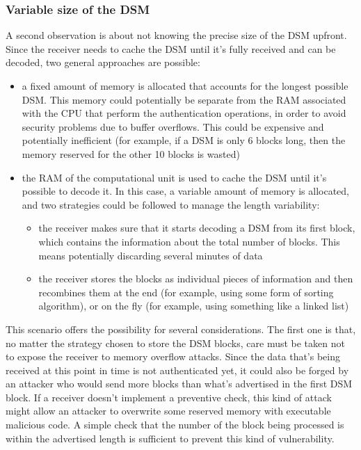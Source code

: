 \subsubsection{Variable size of the DSM}
A second observation is about not knowing the precise size of the DSM upfront.
Since the receiver needs to cache the DSM until it's fully received and can be
decoded, two general approaches are possible:
\begin{itemize}
  \item a fixed amount of memory is allocated that accounts for the longest
    possible DSM. This memory could potentially be separate from the RAM
    associated with the CPU that perform the authentication operations, in order
    to avoid security problems due to buffer overflows. This could be expensive
    and potentially inefficient (for example, if a DSM is only 6 blocks long,
    then the memory reserved for the other 10 blocks is wasted)
  \item the RAM of the computational unit is used to cache the DSM until it's
    possible to decode it. In this case, a variable amount of memory is
    allocated, and two strategies could be followed to manage the length
    variability:
    \begin{itemize}
      \item the receiver makes sure that it starts decoding a DSM from its first
        block, which contains the information about the total number of blocks.
        This means potentially discarding several minutes of data
      \item the receiver stores the blocks as individual pieces of information
        and then recombines them at the end (for example, using some form of
        sorting algorithm), or on the fly (for example, using something like a
        linked list)
    \end{itemize}
\end{itemize}

This scenario offers the possibility for several considerations. The first one
is that, no matter the strategy chosen to store the DSM blocks, care must be
taken not to expose the receiver to memory overflow attacks. Since the data
that's being received at this point in time is not authenticated yet, it could
also be forged by an attacker who would send more blocks than what's advertised
in the first DSM block. If a receiver doesn't implement a preventive check, this
kind of attack might allow an attacker to overwrite some reserved memory with
executable malicious code. A simple check that the number of the block being
processed is within the advertised length is sufficient to prevent this kind of
vulnerability.

